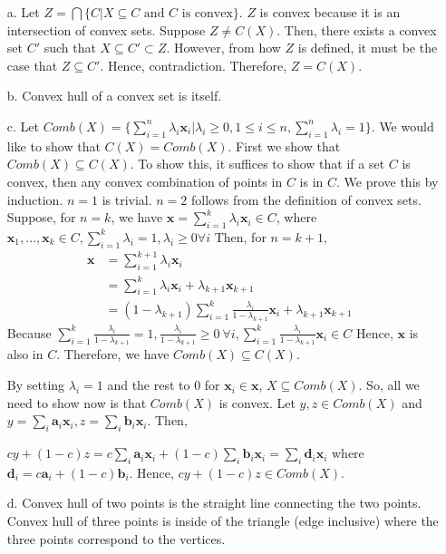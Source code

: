 \documentclass[11pt]{article}
\newcommand{\bx}{\mathbf{x}}
\newcommand{\bd}{\mathbf{d}}
\newcommand{\ba}{\mathbf{a}}
\begin{document}
\color{blue}
\begin{itemize}
\item [a.] Let $Z = \bigcap \{C| \text{$X \subseteq C$ and $C$ is convex}\}$. $Z$ is convex because it is an intersection of convex sets. Suppose $Z \neq C(X)$. Then, there exists a convex set $C'$ such that $X \subseteq C' \subset Z$. However, from how $Z$ is defined, it must be the case that $Z \subseteq C'$. Hence, contradiction. Therefore, $Z=C(X)$.
\item [b.] Convex hull of a convex set is itself.
\item [c.] Let $Comb(X) = \{\sum_{i=1}^n \lambda_i \bx_i | \lambda_i \geq 0, 1 \leq i \leq n, \sum_{i=1}^n \lambda_i = 1 \}$. We would like to show that $C(X)=Comb(X)$. First we show that $Comb(X) \subseteq C(X)$. To show this, it suffices to show that if a set $C$ is convex, then any convex combination of points in $C$ is in $C$. We prove this by induction.
$n=1$ is trivial. $n=2$ follows from the definition of convex sets.
Suppose, for $n=k$, we have $\bx = \sum_{i=1}^k \lambda_i \bx_i \in C$, where $\bx_1, ..., \bx_k \in C, \sum_{i=1}^k \lambda_i = 1, \lambda_i \geq 0 \forall i$ 
Then, for $n=k+1$, 
\begin{align*}
\bx &= \sum_{i=1}^{k+1} \lambda_i \bx_i &\\
&= \sum_{i=1}^k \lambda_i \bx_i + \lambda_{k+1} \bx_{k+1} &\\
&= (1 - \lambda_{k+1}) \sum_{i=1}^k \frac{\lambda_i}{1-\lambda_{k+1}}\bx_i + \lambda_{k+1} \bx_{k+1} 
\end{align*}
Because $\sum_{i=1}^k \frac{\lambda_i}{1-\lambda_{k+1}} = 1, \frac{\lambda_i}{1-\lambda_{k+1}} \geq 0 \ \forall i, \sum_{i=1}^k \frac{\lambda_i}{1-\lambda_{k+1}} \bx_i \in C$
Hence, $\bx$ is also in $C$. Therefore, we have $Comb(X) \subseteq C(X)$.

By setting $\lambda_i=1$ and the rest to $0$ for $\bx_i \in \bx$, $X \subseteq Comb(X)$. So, all we need to show now is that $Comb(X)$ is convex.
Let $y,z \in Comb(X)$ and $y=\sum_i \ba_i \bx_i, z=\sum_i \textbf{b}_i \bx_i$. Then,

$cy+(1-c)z = c\sum_i \ba_i \bx_i + (1-c) \sum_i \textbf{b}_i \bx_i = \sum_i \bd_i \bx_i$ where $\bd_i = c\ba_i + (1-c) \textbf{b}_i$.
Hence, $c y + (1-c) z \in Comb(X)$.
\item [d.] Convex hull of two points is the straight line connecting the two points. Convex hull of three points is inside of the triangle (edge inclusive) where the three points correspond to the vertices.
\end{itemize}
\color{black}
\end{document}
